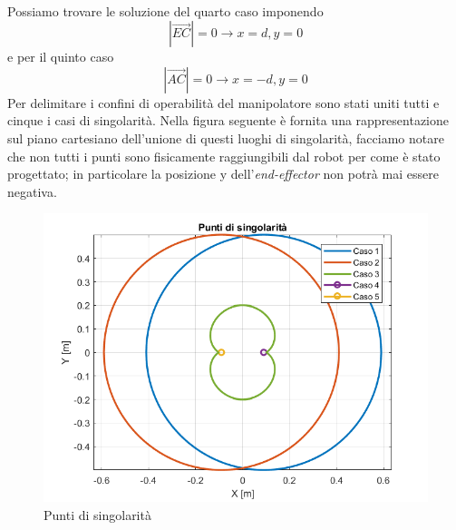 \\Possiamo trovare le soluzione del quarto caso imponendo \begin{equation}|\overrightarrow{EC}| = 0 \rightarrow x=d, y = 0
\end{equation}
e per il quinto caso 
\begin{equation}
	|\overrightarrow{AC}| = 0 \rightarrow x=-d, y=0
\end{equation}
Per delimitare i confini di operabilità del manipolatore sono stati uniti tutti e cinque i casi di singolarità. Nella figura seguente è fornita una rappresentazione sul piano cartesiano dell'unione di questi luoghi di singolarità, facciamo notare che non tutti i punti sono fisicamente raggiungibili dal robot per come è stato progettato; in particolare la posizione y dell'\textit{end-effector} non potrà mai essere negativa.
\begin{figure}[ht]
\begin{center}
    \includegraphics[scale=0.6]{Immagini/Singolarity/SingNewNew}
    \caption{Punti di singolarità}
    \label{puntiSing}
\end{center}
\end{figure}
